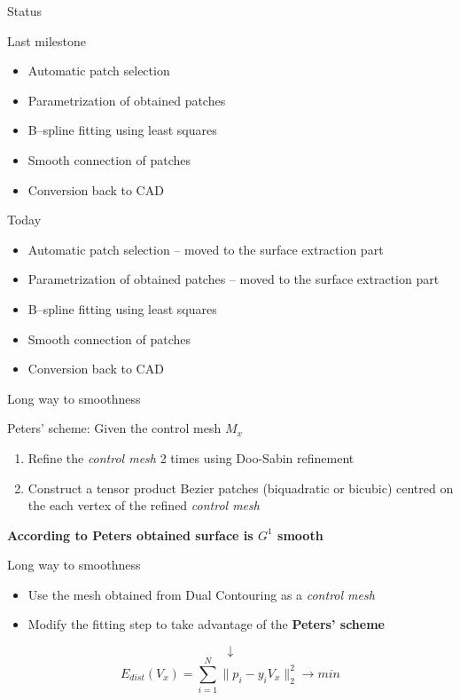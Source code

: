 \newcommand{\norm}[1]{\parallel #1 \parallel_2}

\begin{frame}{Status}
\begin{block}{Last milestone}
\begin{itemize}
	\item[\textcolor{red}{\XSolidBrush}] Automatic patch selection
	\item[\textcolor{red}{\XSolidBrush}] Parametrization of obtained patches
	\item[\textcolor{green}{\Checkmark}] B--spline fitting using least squares
	\item[\textcolor{black}{\VarClock}] Smooth connection of patches
	\item[\textcolor{red}{\XSolidBrush}] Conversion back to CAD
\end{itemize}
\end{block}
\begin{block}{Today}
\begin{itemize}
	\item[\textcolor{green}{\Checkmark}] Automatic patch selection -- {\color{gray}moved to the surface extraction part}
	\item[\textcolor{green}{\Checkmark}] Parametrization of obtained patches -- {\color{gray} moved to the surface extraction part}
	\item[\textcolor{green}{\Checkmark}] B--spline fitting using least squares
	\item[\textcolor{green}{\Checkmark}] Smooth connection of patches
	\item[\textcolor{red}{\XSolidBrush}] Conversion back to CAD
\end{itemize}
\end{block}
\end{frame}
\begin{frame}{Long way to smoothness}
\begin{block}{Peters' scheme:}
Given the control mesh $M_{x}$
\begin{enumerate}
\item Refine the \textit{control mesh} 2 times using Doo-Sabin refinement
\item Construct a tensor product Bezier patches (biquadratic or bicubic) centred on the each vertex of the refined \textit{control mesh}
\end{enumerate}
\end{block}
\textbf{{\color{red} According to Peters obtained surface is $G^{1}$ smooth}}
\end{frame}
\begin{frame}{Long way to smoothness}
\begin{itemize}
\item Use the mesh obtained from Dual Contouring as a \textit{control mesh}
\item Modify the fitting step to take advantage of the \textbf{Peters' scheme}
\end{itemize}
$$\downarrow$$
\begin{equation}
E_{dist}(V_{x}) = \sum_{i=1}^{N}\norm{p_{i} - y_{i}V_{x}}^{2} \rightarrow min
\end{equation}
\end{frame}